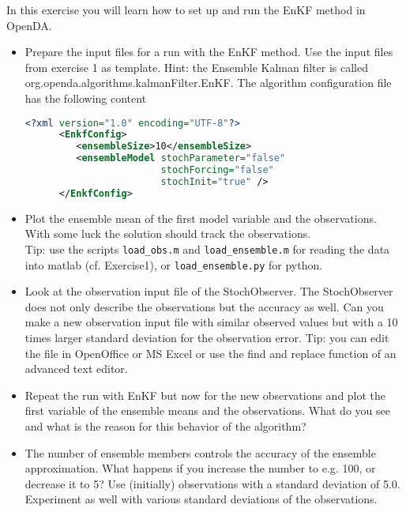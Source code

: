 \documentclass[a4paper,10pt]{article}
\begin{document}
In this exercise you will learn how to set up and run the EnKF method in OpenDA.

\begin{itemize}
  \item Prepare the input files for a run with the EnKF method. Use the input
        files from exercise 1 as template. Hint: the Ensemble Kalman filter
        is called org.openda.algorithms.kalmanFilter.EnKF. The algorithm
        configuration file has the following content
      \begin{lstlisting}[language=XML,frame=single,caption={XML-input for EnKF algorithm}]
      <?xml version="1.0" encoding="UTF-8"?>
      <EnkfConfig>
         <ensembleSize>10</ensembleSize>
         <ensembleModel stochParameter="false"
                        stochForcing="false"
                        stochInit="true" />
      </EnkfConfig>
      \end{lstlisting}

  \item Plot the ensemble mean of the first model variable and the observations.
        With some luck the solution should track the observations.\\
        Tip: use the scripts {\tt load\_obs.m} and {\tt load\_ensemble.m} for reading the
        data into matlab (cf. Exercise1), or {\tt load\_ensemble.py} for python.
 \item Look at the observation input file of the StochObserver. The
       StochObserver does not only describe the observations but the accuracy
       as well. Can you make a new observation input file with similar
       observed values but with a 10 times larger standard deviation for the
       observation error.
       Tip: you can edit the file in OpenOffice or MS Excel or use the find
       and replace function of an advanced text editor.
 \item Repeat the run with EnKF but now for the new observations and plot
       the first variable of the ensemble means and the observations. What do
       you see and what is the reason for this behavior of the algorithm?
 \item The number of ensemble members controls the accuracy of the ensemble
       approximation. What happens if you increase the number to e.g. 100, or
       decrease it to 5? Use (initially) observations with a standard deviation
       of 5.0. Experiment as well with various standard
       deviations of the observations.
\end{itemize}
\end{document}
